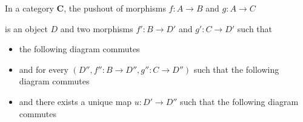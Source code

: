     \item In a category $\mathbf{C}$, the pushout of morphisms $f: A \to B$ and $g : A \to C$ 
    \begin{center}
    \end{center}
    is an object $D$ and two morphisms $f': B \to D'$ and $g' : C \to D'$ such that
    \begin{itemize}
        \item the following diagram commutes
        \begin{center}
        \end{center}
        \item 
        and for every $(D'',f'': B \to D'', g'': C \to D'')$ such that the following diagram commutes
        \begin{center}
        \end{center}
        \item and there exists a unique map $u: D' \to D''$ such that the following diagram commutes
        \begin{center}
        \end{center}    
    \end{itemize} 
    

